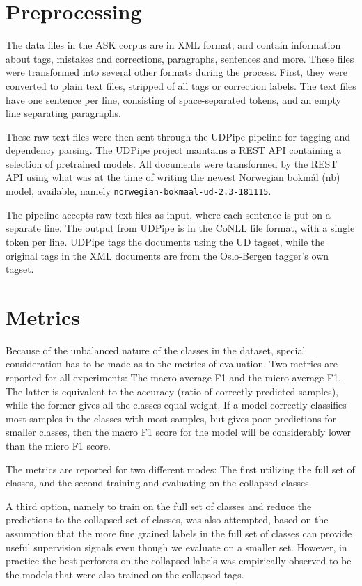 
\section{Preprocessing}

The data files in the ASK corpus are in XML format, and contain information
about tags, mistakes and corrections, paragraphs, sentences and more. These
files were transformed into several other formats during the process. First,
they were converted to plain text files, stripped of all tags or correction
labels. The text files have one sentence per line, consisting of
space-separated tokens, and an empty line separating paragraphs.

These raw text files were then sent through the UDPipe pipeline
\autocite{udpipe:2017} for tagging and dependency parsing. The UDPipe project
maintains a REST API containing a selection of pretrained models. All
documents were transformed by the REST API using what was at the time of
writing the newest Norwegian bokmål (nb) model, available, namely
\texttt{norwegian-bokmaal-ud-2.3-181115}.

The pipeline accepts raw text files as input, where each sentence is put on a
separate line. The output from UDPipe is in the CoNLL file format, with a
single token per line. UDPipe tags the documents using the UD tagset, while
the original tags in the XML documents are from the Oslo-Bergen tagger's own
tagset.

\section{Metrics}

Because of the unbalanced nature of the classes in the dataset, special
consideration has to be made as to the metrics of evaluation. Two metrics are
reported for all experiments: The macro average F1 and the micro average F1.
The latter is equivalent to the accuracy (ratio of correctly predicted
samples), while the former gives all the classes equal weight. If a model
correctly classifies most samples in the classes with most samples, but gives
poor predictions for smaller classes, then the macro F1 score for the model
will be considerably lower than the micro F1 score.

The metrics are reported for two different modes: The first utilizing the
full set of classes, and the second training and evaluating on the collapsed
classes.

A third option, namely to train on the full set of classes and reduce the
predictions to the collapsed set of classes, was also attempted, based on the
assumption that the more fine grained labels in the full set of classes can
provide useful supervision signals even though we evaluate on a smaller set.
However, in practice the best perforers on the collapsed labels was
empirically observed to be the models that were also trained on the collapsed
tags.

